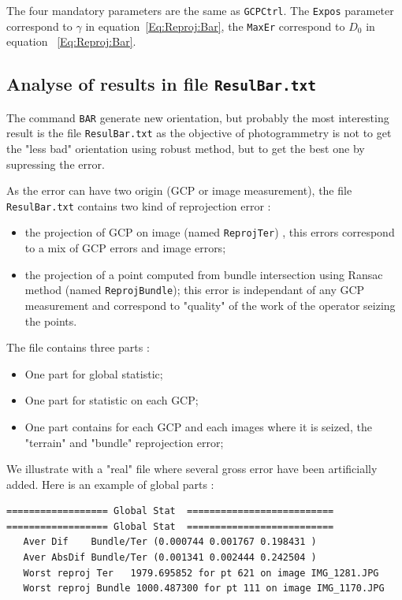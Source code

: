 The four mandatory parameters are the same as {\tt GCPCtrl}. The {\tt Expos} parameter
correspond to $\gamma$ in equation~\ref{Eq:Reproj:Bar}, the {\tt MaxEr}
correspond to $D_0$ in equation ~\ref{Eq:Reproj:Bar}.

\subsection{Analyse of results in file {\tt ResulBar.txt}}

The command {\tt BAR} generate new orientation, but probably the most interesting result 
is the file {\tt ResulBar.txt} as  the objective of photogrammetry is not to get the "less bad" orientation 
using robust method, but to get the best one by supressing the error.

As the error can have two origin (GCP or image measurement), the file  {\tt ResulBar.txt} contains
two kind of reprojection error :

\begin{itemize}
   \item the projection of GCP on image (named {\tt ReprojTer}) , this errors correspond to a mix of
         GCP errors and  image errors;

   \item the projection of a point computed from bundle intersection using Ransac method (named {\tt ReprojBundle}); 
         this error is independant of any GCP measurement and correspond to "quality" of the work
          of the operator seizing the points.
\end{itemize}

The file contains three parts :

\begin{itemize}
   \item One part for global statistic;

   \item One part for statistic on each GCP;

   \item One part contains for each GCP and each images where it is seized, the "terrain" and "bundle" 
         reprojection error;
\end{itemize}


We illustrate with a "real" file  where several gross error have been artificially added.
Here is an example of global parts :


\begin{verbatim}
================== Global Stat  ==========================
================== Global Stat  ==========================
   Aver Dif    Bundle/Ter (0.000744 0.001767 0.198431 )
   Aver AbsDif Bundle/Ter (0.001341 0.002444 0.242504 )
   Worst reproj Ter   1979.695852 for pt 621 on image IMG_1281.JPG
   Worst reproj Bundle 1000.487300 for pt 111 on image IMG_1170.JPG
\end{verbatim}

